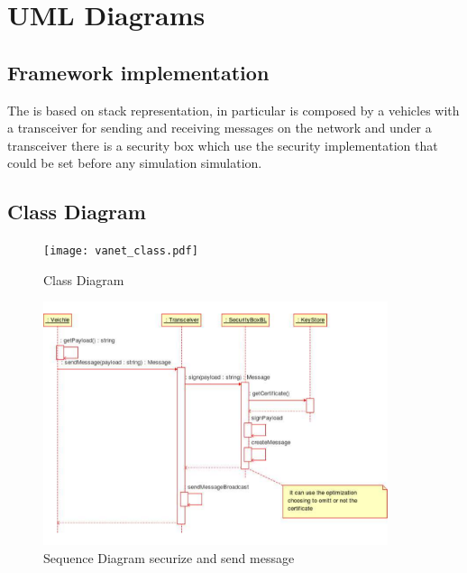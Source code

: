 \section{UML Diagrams}
\subsection{Framework implementation}
The \vs is based on stack representation, in particular is composed by a vehicles with a transceiver for sending and receiving messages on the network and under a transceiver there is a security box which use the security implementation that could be set before any simulation simulation.
\subsection{Class Diagram}
\begin{figure}[ht]
\centerline{\texttt{[image: vanet\_class.pdf]}}
\caption{Class Diagram}
\label{fig:class_diagram}
\end{figure}
\begin{figure}[ht]
\centerline{\includegraphics[width=0.9\textwidth]{baseline_send_message.pdf}}
\caption{Sequence Diagram \baseline securize and send message}
\label{fig:sequence_send_baseline}
\end{figure}
